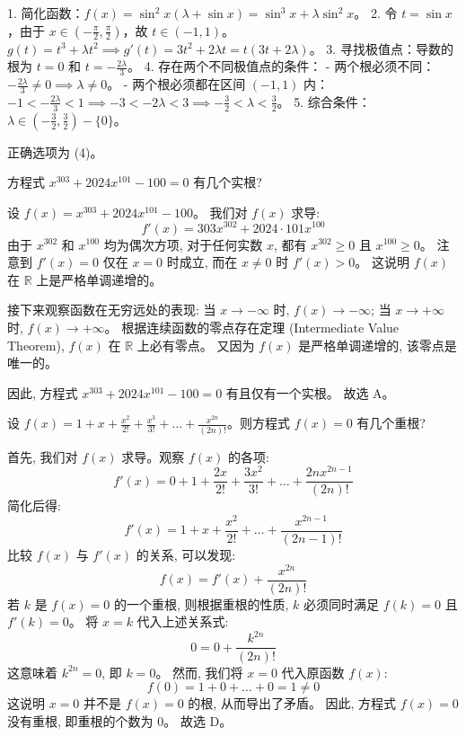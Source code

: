 \begin{questions}
\begin{solution}
1. 简化函数：$f(x) = \sin^2 x (\lambda + \sin x) = \sin^3 x + \lambda \sin^2 x$。
2. 令 $t = \sin x$，由于 $x \in (-\frac{\pi}{2}, \frac{\pi}{2})$，故 $t \in (-1, 1)$。
   $g(t) = t^3 + \lambda t^2 \implies g'(t) = 3t^2 + 2\lambda t = t(3t + 2\lambda)$。
3. 寻找极值点：导数的根为 $t = 0$ 和 $t = -\frac{2\lambda}{3}$。
4. 存在两个不同极值点的条件：
   - 两个根必须不同：$-\frac{2\lambda}{3} \neq 0 \implies \lambda \neq 0$。
   - 两个根必须都在区间 $(-1, 1)$ 内：
     $-1 < -\frac{2\lambda}{3} < 1 \implies -3 < -2\lambda < 3 \implies -\frac{3}{2} < \lambda < \frac{3}{2}$。
5. 综合条件：$\lambda \in (-\frac{3}{2}, \frac{3}{2}) - \{0\}$。

正确选项为 (4)。
\end{solution}
        
    \question 方程式 $x^{303} + 2024x^{101} - 100 = 0$ 有几个实根?

\begin{solution}
设 $f(x) = x^{303} + 2024x^{101} - 100$。
我们对 $f(x)$ 求导:
\[
f'(x) = 303x^{302} + 2024 \cdot 101x^{100}
\]
由于 $x^{302}$ 和 $x^{100}$ 均为偶次方项, 对于任何实数 $x$, 都有 $x^{302} \geq 0$ 且 $x^{100} \geq 0$。
注意到 $f'(x) = 0$ 仅在 $x = 0$ 时成立, 而在 $x \neq 0$ 时 $f'(x) > 0$。
这说明 $f(x)$ 在 $\mathbb{R}$ 上是严格单调递增的。

接下来观察函数在无穷远处的表现:
当 $x \to -\infty$ 时, $f(x) \to -\infty$;
当 $x \to +\infty$ 时, $f(x) \to +\infty$。
根据连续函数的零点存在定理 (Intermediate Value Theorem), $f(x)$ 在 $\mathbb{R}$ 上必有零点。
又因为 $f(x)$ 是严格单调递增的, 该零点是唯一的。

因此, 方程式 $x^{303} + 2024x^{101} - 100 = 0$ 有且仅有一个实根。
故选 A。
\end{solution}
\question 设 $f(x) = 1 + x + \frac{x^2}{2!} + \frac{x^3}{3!} + \dots + \frac{x^{2n}}{(2n)!}$。则方程式 $f(x) = 0$ 有几个重根?

\begin{solution}
首先, 我们对 $f(x)$ 求导。观察 $f(x)$ 的各项:
\[
f'(x) = 0 + 1 + \frac{2x}{2!} + \frac{3x^2}{3!} + \dots + \frac{2nx^{2n-1}}{(2n)!}
\]
简化后得:
\[
f'(x) = 1 + x + \frac{x^2}{2!} + \dots + \frac{x^{2n-1}}{(2n-1)!}
\]
比较 $f(x)$ 与 $f'(x)$ 的关系, 可以发现:
\[
f(x) = f'(x) + \frac{x^{2n}}{(2n)!}
\]
若 $k$ 是 $f(x) = 0$ 的一个重根, 则根据重根的性质, $k$ 必须同时满足 $f(k) = 0$ 且 $f'(k) = 0$。
将 $x = k$ 代入上述关系式:
\[
0 = 0 + \frac{k^{2n}}{(2n)!}
\]
这意味着 $k^{2n} = 0$, 即 $k = 0$。
然而, 我们将 $x = 0$ 代入原函数 $f(x)$:
\[
f(0) = 1 + 0 + \dots + 0 = 1 \neq 0
\]
这说明 $x = 0$ 并不是 $f(x) = 0$ 的根, 从而导出了矛盾。
因此, 方程式 $f(x) = 0$ 没有重根, 即重根的个数为 0。
故选 D。
\end{solution}


\end{questions}
